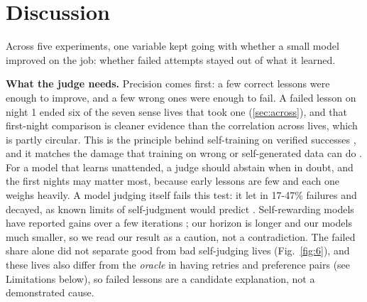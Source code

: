 \section{Discussion}\label{sec:discussion}

Across five experiments, one variable kept going with whether a small model improved on the job: whether failed attempts stayed out of what it learned.

\textbf{What the judge needs.} Precision comes first: a few correct lessons were enough to improve, and a few wrong ones were enough to fail. A failed lesson on night 1 ended six of the seven sense lives that took one (\ref{sec:across}), and that first-night comparison is cleaner evidence than the correlation across lives, which is partly circular. This is the principle behind self-training on verified successes \cite{zelikman2022star, gulcehre2023reinforced, singh2024beyond}, and it matches the damage that training on wrong or self-generated data can do \cite{shumailov2024ai}. For a model that learns unattended, a judge should abstain when in doubt, and the first nights may matter most, because early lessons are few and each one weighs heavily. A model judging itself fails this test: it let in 17-47\% failures and decayed, as known limits of self-judgment would predict \cite{huang2024large, zheng2023judging, gao2023scaling}. Self-rewarding models have reported gains over a few iterations \cite{yuan2024selfrewarding, wu2025meta}; our horizon is longer and our models much smaller, so we read our result as a caution, not a contradiction. The failed share alone did not separate good from bad self-judging lives (Fig.~\ref{fig:6}), and these lives also differ from the \emph{oracle} in having retries and preference pairs (see Limitations below), so failed lessons are a candidate explanation, not a demonstrated cause.

